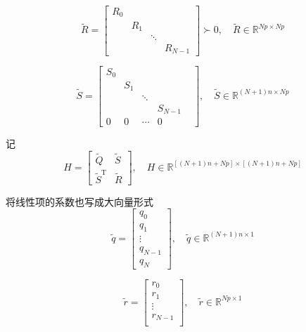 \documentclass[withoutpreface,bwprint]{NoteBook}
\begin{document}
\begin{equation}
\label{eq:block_KKT_big_R_define}
\tilde{R} = \begin{bmatrix}
R_0 & & & \\
& R_1 & &  \\
& & \ddots &  \\
& & & R_{N-1} 
\end{bmatrix} \succ 0 
,\quad \tilde{R} \in \mathbb{R}^{N p \times N p}
\end{equation}

\begin{equation}
\label{eq:block_KKT_big_S_define}
\tilde{S} = \begin{bmatrix}
S_0 & & & \\
& S_1 & &  \\
& & \ddots &  \\
& & & S_{N-1} \\
0 & 0 & \cdots & 0 & 
\end{bmatrix}
,\quad \tilde{S} \in \mathbb{R}^{(N+1) n \times N p}
\end{equation}

记
\begin{equation}
\label{eq:block_KKT_H_define}
H = \begin{bmatrix}
\tilde{Q} & \tilde{S} \\
\tilde{S}^\mathrm{T} &\tilde{R} 
\end{bmatrix}
,\quad H \in \mathbb{R}^{[(N+1)n+Np] \times [(N+1)n+Np]}
\end{equation}

将线性项的系数也写成大向量形式
\begin{equation}
\label{eq:block_KKT_big_q_define}
\tilde{q} = \begin{bmatrix}
q_0\\
q_1 \\
\vdots \\
q_{N-1} \\
q_{N}
\end{bmatrix}
,\quad \tilde{q} \in \mathbb{R}^{(N+1) n \times 1}
\end{equation}

\begin{equation}
\label{eq:block_KKT_big_r_define}
\tilde{r} = \begin{bmatrix}
r_0\\
r_1 \\
\vdots \\
r_{N-1} \\
\end{bmatrix}
,\quad \tilde{r} \in \mathbb{R}^{N p \times 1}
\end{equation}
\end{document}
